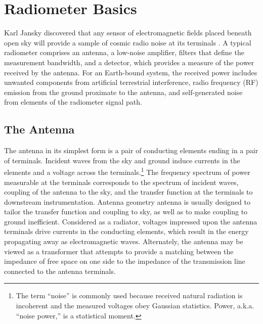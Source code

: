 


\section{Radiometer Basics}

Karl Jansky discovered that any sensor of electromagnetic fields placed beneath open sky will provide a sample of cosmic radio noise at its terminals \cite{jansky33}.  A typical radiometer comprises an antenna, a low-noise amplifier, filters that define the measurement bandwidth, and a detector, which provides a measure of the power received by the antenna. For an Earth-bound system, the received power includes unwanted components from artificial terrestrial interference, radio frequency (RF) emission from the ground proximate to the antenna, and self-generated noise from elements of the radiometer signal path. 

\subsection{The Antenna}
  
  The antenna in its simplest form is a pair of conducting elements ending in a pair of terminals.  Incident waves from the sky and ground induce currents in the elements and a voltage across the terminals.\footnote{The term ``noise'' is commonly used because received natural radiation is incoherent and the measured voltages obey Gaussian statistics.  Power, a.k.a. ``noise power,'' is a statistical moment.}  The frequency spectrum of power measurable at the terminals corresponds to the spectrum of incident waves,  coupling of the antenna to the sky, and the transfer function at the terminals to downstream instrumentation. 
  Antenna geometry antenna is usually designed to tailor the transfer function and coupling to sky, as well as to make  coupling to ground inefficient. Considered as a radiator, voltages impressed upon the antenna terminals drive currents in the conducting elements, which result in the energy propagating away as electromagnetic waves.  Alternately, the antenna may be viewed as a transformer that attempts to provide a matching between the impedance of free space on one side to the impedance of the transmission line connected to the antenna terminals.
  
